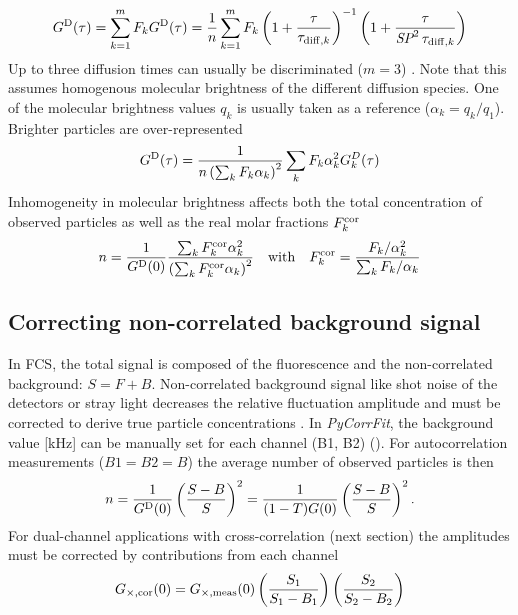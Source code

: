 	\begin{equation}
	\label{eq14}
	G^{\rm D}(\tau) = \sum_{k=1}^m F_k G^{\rm D}(\tau) = \frac{1}{n} \sum_{k=1}^m F_k \left(1+\frac{\tau}{\tau_{{\rm diff},k}} \right) ^{-1} \left(1+\frac{\tau}{\textit{SP}^2 \, \tau_{{\rm diff},k}} \right)
	\end{equation}
Up to three diffusion times can usually be discriminated ($m = 3$) \cite{Meseth1999}. Note that this assumes homogenous molecular brightness of the different diffusion species. One of the molecular brightness values $q_k$ is usually taken as a reference ($\alpha_k = q_k/q_1$). Brighter particles are over-represented \cite{Thompson1991}
	\begin{equation}
	\label{eq15}
	G^{\rm D}(\tau) = \frac{1}{n \left( \sum_k F_k \alpha_k \right)^2} \sum_k F_k \alpha_k^2 G_k^D(\tau)
	\end{equation}
Inhomogeneity in molecular brightness affects both the total concentration of observed particles as well as the real molar fractions $F_k^{\rm cor}$ \cite{Thompson1991}
	\begin{equation}
	\label{eq16}
	n = \frac{1}{G^{\rm D}(0)} \frac{\sum_k F_k^{\rm {cor}} \alpha_k^2}{\left( \sum_k F_k^{\rm {cor}} \alpha_k \right)^2} \quad\mbox {with} \quad F_k^{\rm {cor}} = \frac{F_k/\alpha_k^2}{\sum_k F_k/\alpha_k}
	\end{equation}

\subsection{Correcting non-correlated background signal}
\label{sec:theor.correc}
In FCS, the total signal is composed of the fluorescence and the non-correlated background: $S = F + B$. Non-correlated background signal like shot noise of the detectors or stray light decreases the relative fluctuation amplitude and must be corrected to derive true particle concentrations \cite{Koppel1974,Thompson1991}. In \textit{PyCorrFit}, the background value [kHz] can be manually set for each channel (B1, B2) (). For autocorrelation measurements ($B1 = B2 = B$) the average number of observed particles is then
	\begin{equation}
	\label{eq17}
	n = \frac{1}{G^{\rm D}(0)} \left( \frac{S-B}{S} \right)^2 = \frac{1}{(1-T)G(0)} \left( \frac{S-B}{S} \right)^2.
	\end{equation}
For dual-channel applications with cross-correlation (next section) the amplitudes must be corrected by contributions from each channel \cite{Weidemann2013}
	\begin{equation}
	\label{eq18}
	G_{\times,\rm {cor}}(0) = G_{\times, \rm meas}(0) \left( \frac{S_1}{S_1-B_1} \right) \left( \frac{S_2}{S_2-B_2} \right) 
	\end{equation}

